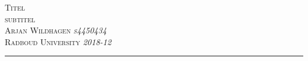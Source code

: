 \documentclass[hidelinks]{article}
\begin{document}
\begin{center}

\scshape 
	\huge{Titel}\\[5mm]
	\large{subtitel}\\[5mm]
	\normalsize{Arjan Wildhagen \hfill \textit{s4450434}}\\
	\normalsize{Radboud University \hfill \textit{2018-12}}
           \vspace{0.3\baselineskip}
	\rule{\textwidth}{0.4pt} \\
	\vspace{0.3\baselineskip}
\end{center}


\end{document}
